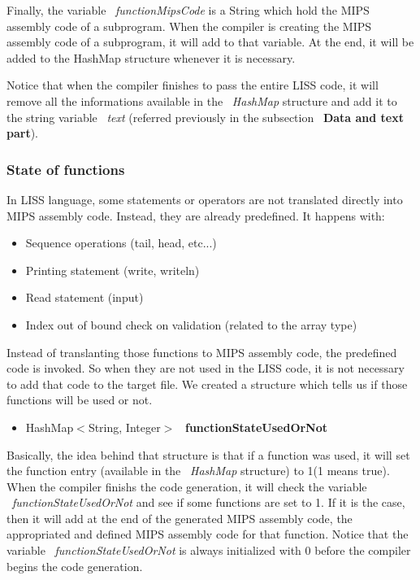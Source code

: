 \documentclass[
  oneside,
  11pt, a4paper,
  footinclude=true,
  headinclude=true,
  cleardoublepage=empty
]{scrbook}
\begin{document}
Finally, the variable ~\textit{functionMipsCode} is a String which hold the MIPS assembly code of a subprogram. When the compiler is creating the MIPS assembly code of a subprogram, it will add to that variable. At the end, it will be added to the HashMap structure whenever it is necessary.

Notice that when the compiler finishes to pass the entire LISS code, it will remove all the informations available in the ~\textit{HashMap} structure and add it to the string variable ~\textit{text} (referred previously in the subsection ~\textbf{Data and text part}).

\subsubsection{State of functions}

In LISS language, some statements or operators are not translated directly into MIPS assembly code. Instead, they are already predefined.
It happens with:

\begin{itemize}
\item Sequence operations (tail, head, etc...)
\item Printing statement (write, writeln)
\item Read statement (input)
\item Index out of bound check on validation (related to the array type)
\end{itemize}

Instead of translanting those functions to MIPS assembly code, the predefined code is invoked. So when they are not used in the LISS code, it is not necessary to add that code to the target file.
We created a structure which tells us if those functions will be used or not.

\begin{itemize}
\item  HashMap$<$String, Integer$>$ ~\textbf{functionStateUsedOrNot}
\end{itemize}

Basically, the idea behind that structure is that if a function was used, it will set the function entry (available in the ~\textit{HashMap} structure) to 1(1 means true).
When the compiler finishs the code generation, it will check the variable ~\textit{functionStateUsedOrNot} and see if some functions are set to 1. If it is the case, then it will add at the end of the generated MIPS assembly code, the appropriated and defined MIPS assembly code for that function.
Notice that the variable ~\textit{functionStateUsedOrNot} is always initialized with 0 before the compiler begins the code generation.
\end{document}
